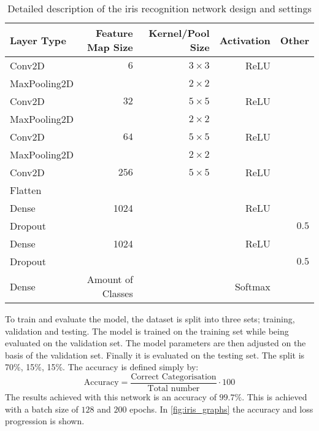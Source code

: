 \begin{table}[H]
	\centering
	\caption{Detailed description of the iris recognition network design and settings}
	\label{tab:iris_cnn}
	\begin{tabular}{lrrrr}
		\textbf{Layer Type}   & \textbf{Feature Map Size}  & \textbf{Kernel/Pool Size} & \textbf{Activation} & \textbf{Other} \\ \hline
		Conv2D       & $6$               & $3\times3$       & ReLU       &       \\
		\rowcolor{lightGrey} 
		MaxPooling2D &                   & $2\times2$       &            &       \\
		Conv2D       & $32$              & $5\times5$       & ReLU       &       \\
		\rowcolor{lightGrey} 
		MaxPooling2D &                   & $2\times2$       &            &       \\
		Conv2D       & $64$              & $5\times5$       & ReLU       &       \\
		\rowcolor{lightGrey} 
		MaxPooling2D &                   & $2\times2$       &            &       \\
		Conv2D       & $256$             & $5\times5$       & ReLU       &       \\
		\rowcolor{lightGrey} 
		Flatten      &                   &                  &            &       \\
		Dense        & 1024              &                  & ReLU           &       \\
		\rowcolor{lightGrey} 
		Dropout      &                   &                  &            & $0.5$ \\
		Dense        & 1024              &                  & ReLU           &       \\
		\rowcolor{lightGrey} 
		Dropout      &                   &                  &            & $0.5$ \\
		Dense        & Amount of Classes &                  & Softmax   &      
	\end{tabular}
\end{table}

To train and evaluate the model, the dataset is split into three sets; training, validation and testing. The model is trained on the training set while being evaluated on the validation set. The model parameters are then adjusted on the basis of the validation set. Finally it is evaluated on the testing set. The split is 70\%, 15\%, 15\%. The accuracy is defined simply by:
\begin{equation}
\text{Accuracy} = \frac{\text{Correct Categorisation}}{\text{Total number}}\cdot100 
\end{equation}
The results achieved with this network is an accuracy of $99.7\%$. This is achieved with a batch size of $128$ and $200$ epochs. In \autoref{fig:iris_graphs} the accuracy and loss progression is shown.

